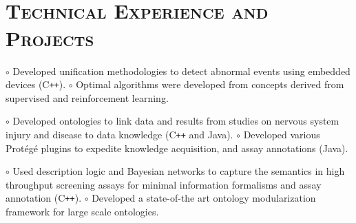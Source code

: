 \begin{resume}



\begin{formatb}
  \\
  \body\\
\end{formatb}

\vspace{-2mm}
\section{\textsc{Technical Experience and Projects}}

\begin{position}
$\circ$ Developed  unification methodologies to detect abnormal events using embedded devices 
(C\texttt{++}). \newline
$\circ$ Optimal algorithms were developed from concepts derived from supervised  and 
reinforcement learning.
\end{position}

\begin{position}
$\circ$ Developed ontologies to link data 
and results from studies on nervous system injury and disease to data knowledge (C\texttt{++} and 
Java). \newline $\circ$ Developed  various Prot\'{e}g\'{e} plugins to 
expedite knowledge acquisition, and assay annotations (Java).
\end{position}

\begin{position}
$\circ$ Used description logic and Bayesian networks to capture the semantics 
in high throughput screening assays for minimal information formalisms and assay annotation 
(C\texttt{++}). \newline 
$\circ$ Developed a state-of-the art ontology modularization 
framework for large scale ontologies. 
\end{position}


\end{resume}
